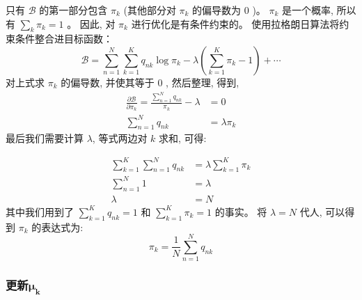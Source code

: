 \documentclass[UTF8]{ctexart}
\begin{document}
只有 $\mathcal{B}$ 的第一部分包含 $\pi_{k}$ (其他部分对 
$\pi_{k}$ 的偏导数为 0 )。 $\pi_{k}$ 是一个概率, 所以有 $\sum_{k} \pi_{k}=1$ 。
因此, 对 $\pi_{k}$ 进行优化是有条件约束的。
使用拉格朗日算法将约束条件整合进目标函数：
\begin{equation}
    \mathcal{B}=\sum_{n=1}^{N} \sum_{k=1}^{K} q_{n k} \log \pi_{k}-\lambda\left(\sum_{k=1}^{K} \pi_{k}-1\right)+\cdots
\end{equation}
对上式求 $\pi_{k}$ 的偏导数, 并使其等于 0 , 然后整理, 得到,
$$
\begin{aligned}
\frac{\partial \mathcal{B}}{\partial \pi_{k}}=\frac{\sum_{n=1}^{N} q_{n k}}{\pi_{k}}-\lambda &=0 \\
\sum_{n=1}^{N} q_{n k} &=\lambda \pi_{k}
\end{aligned}
$$
最后我们需要计算 $\lambda$, 等式两边对 $k$ 求和, 可得:

$$
\begin{aligned}
\sum_{k=1}^{K} \sum_{n=1}^{N} q_{n k} &=\lambda \sum_{k=1}^{K} \pi_{k} \\
\sum_{n=1}^{N} 1 &=\lambda \\
\lambda &=N
\end{aligned}
$$
其中我们用到了 $\sum_{k=1}^{K} q_{n k}=1$ 
和 $\sum_{k=1}^{K} \pi_{k}=1$ 的事实。
将 $\lambda=N$ 代人, 可以得到 $\pi_{k}$ 的表达式为:
\begin{equation}
    \pi_{k}=\frac{1}{N} \sum_{n=1}^{N} q_{n k}
\end{equation}

\subsubsection{更新$\boldsymbol{\mu_k}$}
\end{document}
